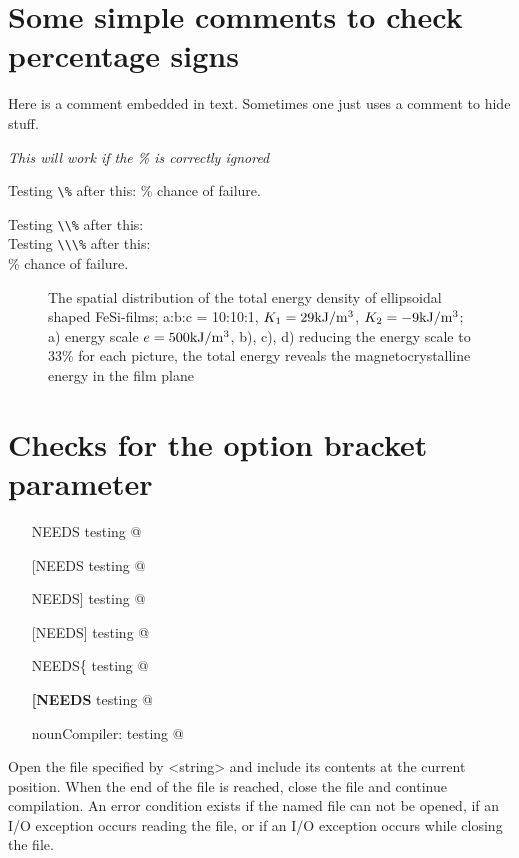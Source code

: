 \documentclass{article}
\begin{document}
\section{Some simple comments to check percentage signs}
Here %
is a comment embedded in text.
Sometimes one just uses
a comment to hide stuff.

{\it This will work %
if the \% is correctly ignored}

Testing \verb#\%# after this: \% chance of failure.

Testing \verb#\\%# after this: \\%

Testing \verb#\\\%# after this: \\\% chance of failure.

\begin{figure}[ht]
\caption{\label{zoom}The spatial distribution of the total energy density of
ellipsoidal shaped FeSi-films; a:b:c = 10:10:1, $K_1 = 29\rm kJ/m^3$, $K_2 = -9 \rm kJ/m^3$;
a) energy scale $e = 500\rm kJ/m^3$,
b), c), d) reducing the energy scale to 33\% for each picture,
the total energy reveals the magnetocrystalline energy in the film
plane}
\end{figure}

\section{Checks for the option bracket parameter}

\begin{itemize}
\item [NEEDS] testing \verb@[NEEDS]@
\item [{[}NEEDS] testing \verb@[{[}NEEDS]@
\item [NEEDS{]}] testing \verb@[NEEDS{]}]@
\item [{[}NEEDS{]}] testing \verb@[{[}NEEDS{]}]@
\item [NEEDS\{] testing \verb@[NEEDS\{]@
\item [{\textbf{\textsc{\large {[}NEEDS}}}] testing \verb@[{\textbf{\textsc{\large {[}NEEDS}}}]@
\item [{noun{Compiler:}}] testing @
\end{itemize}
Open the file specified by <string> and include its contents at the
current position. When the end of the file is reached, close the file
and continue compilation. An error condition exists if the named file
can not be opened, if an I/O exception occurs reading the file, or
if an I/O exception occurs while closing the file.\bigskip{}
\end{document}
